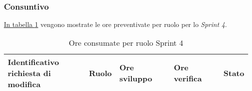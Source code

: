 \subsubsection{Consuntivo}

\hyperref[tab:sprint3_ore_consumate]{In tabella \ref{tab:sprint4_ore_consumate}} vengono mostrate le ore preventivate per ruolo per lo \textit{Sprint 4}.

\begin{table}[H]
    \centering
    \begin{tabular}{| l | l | l | l | l |}
        \hline
            \makecell{\textbf{Identificativo} \\ \textbf{richiesta di modifica}} &
            \textbf{Ruolo} & 
            \textbf{Ore sviluppo} &
            \textbf{Ore verifica} & 
            \textbf{Stato}\\ 
    \hline
    \hline
    \end{tabular}
    \caption{Ore consumate per ruolo Sprint 4}
    \label{tab:sprint4_ore_consumate} 
\end{table}
